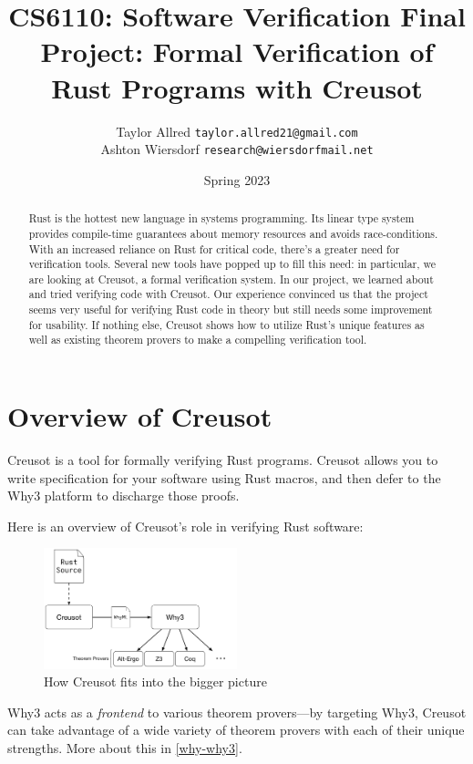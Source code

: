 \documentclass[12pt]{article}
\title{CS6110: Software Verification Final Project: Formal Verification of Rust Programs with Creusot}
\author{Taylor Allred \texttt{taylor.allred21@gmail.com}\\ Ashton Wiersdorf \texttt{research@wiersdorfmail.net}}
\date{Spring 2023}
\begin{document}
\maketitle

\begin{abstract}
\noindent
Rust is the hottest new language in systems programming.
Its linear type system provides compile-time guarantees about memory resources and avoids race-conditions.
With an increased reliance on Rust for critical code, there's a greater need for verification tools.
Several new tools have popped up to fill this need: in particular, we are looking at Creusot, a formal verification system.
In our project, we learned about and tried verifying code with Creusot.
Our experience convinced us that the project seems very useful for verifying Rust code in theory but still needs some improvement for usability.
If nothing else, Creusot shows how to utilize Rust's unique features as well as existing theorem provers to make a compelling verification tool.
\end{abstract}

\setcounter{tocdepth}{2}
\tableofcontents

\clearpage
{}
\section{Overview of Creusot}

Creusot\cite{denisCreusot2023} is a tool for formally verifying Rust programs.
Creusot allows you to write specification for your software using Rust macros, and then defer to the Why3\cite{bobotWhy3ShepherdYour} platform to discharge those proofs.

Here is an overview of Creusot's role in verifying Rust software:

\begin{figure}[h]
  \centering
\includegraphics[width=0.5\textwidth]{creusot_why3_diagram}
\caption{How Creusot fits into the bigger picture}
\end{figure}

Why3 acts as a \emph{frontend} to various theorem provers---by targeting Why3, Creusot can take advantage of a wide variety of theorem provers with each of their unique strengths.
More about this in \ref{why-why3}.
\end{document}
